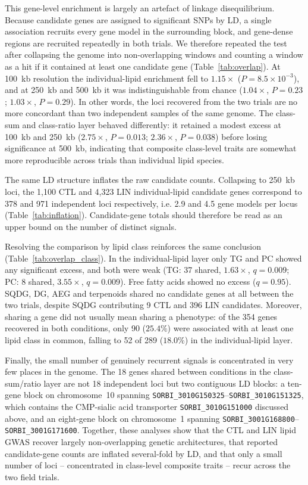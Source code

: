 This gene-level enrichment is largely an artefact of linkage disequilibrium. Because candidate genes are assigned to significant SNPs by LD, a single association recruits every gene model in the surrounding block, and gene-dense regions are recruited repeatedly in both trials. We therefore repeated the test after collapsing the genome into non-overlapping windows and counting a window as a hit if it contained at least one candidate gene (Table~\ref{tab:overlap}). At 100~kb resolution the individual-lipid enrichment fell to $1.15\times$ ($P=8.5\times10^{-3}$), and at 250~kb and 500~kb it was indistinguishable from chance ($1.04\times$, $P=0.23$; $1.03\times$, $P=0.29$). In other words, the loci recovered from the two trials are no more concordant than two independent samples of the same genome. The class-sum and class-ratio layer behaved differently: it retained a modest excess at 100~kb and 250~kb ($2.75\times$, $P=0.013$; $2.36\times$, $P=0.038$) before losing significance at 500~kb, indicating that composite class-level traits are somewhat more reproducible across trials than individual lipid species.

The same LD structure inflates the raw candidate counts. Collapsing to 250~kb loci, the 1{,}100 CTL and 4{,}323 LIN individual-lipid candidate genes correspond to 378 and 971 independent loci respectively, i.e. 2.9 and 4.5 gene models per locus (Table~\ref{tab:inflation}). Candidate-gene totals should therefore be read as an upper bound on the number of distinct signals.

Resolving the comparison by lipid class reinforces the same conclusion (Table~\ref{tab:overlap_class}). In the individual-lipid layer only TG and PC showed any significant excess, and both were weak (TG: 37 shared, $1.63\times$, $q=0.009$; PC: 8 shared, $3.55\times$, $q=0.009$). Free fatty acids showed no excess ($q=0.95$). SQDG, DG, AEG and terpenoids shared no candidate genes at all between the two trials, despite SQDG contributing 9 CTL and 396 LIN candidates. Moreover, sharing a gene did not usually mean sharing a phenotype: of the 354 genes recovered in both conditions, only 90 ($25.4\%$) were associated with at least one lipid class in common, falling to 52 of 289 ($18.0\%$) in the individual-lipid layer.

Finally, the small number of genuinely recurrent signals is concentrated in very few places in the genome. The 18 genes shared between conditions in the class-sum/ratio layer are not 18 independent loci but two contiguous LD blocks: a ten-gene block on chromosome~10 spanning \texttt{SORBI\_3010G150325}--\texttt{SORBI\_3010G151325}, which contains the CMP-sialic acid transporter \texttt{SORBI\_3010G151000} discussed above, and an eight-gene block on chromosome~1 spanning \texttt{SORBI\_3001G168800}--\texttt{SORBI\_3001G171600}. Together, these analyses show that the CTL and LIN lipid GWAS recover largely non-overlapping genetic architectures, that reported candidate-gene counts are inflated several-fold by LD, and that only a small number of loci -- concentrated in class-level composite traits -- recur across the two field trials.

